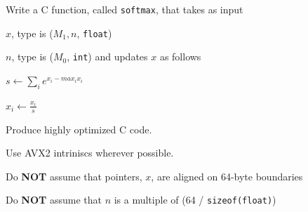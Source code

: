 \documentclass[letterpaper,12pt]{article}
\begin{document}



Write a C function, called {\tt softmax}, that takes as input
\be
\item \(x\), type is (\(M_1, n\), {\tt float})
\item \(n\), type is (\(M_0\), {\tt int})
\ee
and updates \(x\) as follows
\be
\item \(s \leftarrow \sum_i e^{x_i - max_i x_i}\)
\item \(x_i \leftarrow \frac{x_i}{s}\)
  \ee

  \be
\item Produce highly optimized C code.
\item Use AVX2 intriniscs wherever possible.
\item Do {\bf NOT} assume that pointers, \(x\), are aligned on 64-byte boundaries
\item Do {\bf NOT} assume that \(n\) is a multiple of (64 / {\tt sizeof(float)})
  \ee
\end{document}
